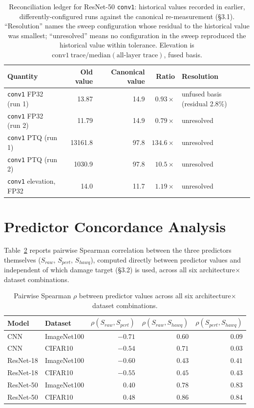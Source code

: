 \documentclass{article}
\begin{document}
\begin{table}[h]
\centering
\small
\caption{Reconciliation ledger for ResNet-50 \texttt{conv1}: historical values recorded in earlier, differently-configured runs against the canonical re-measurement (\S3.1). ``Resolution'' names the sweep configuration whose residual to the historical value was smallest; ``unresolved'' means no configuration in the sweep reproduced the historical value within tolerance. Elevation is $\mathrm{conv1\ trace} / \mathrm{median}(\text{all-layer trace})$, fused basis.}
\label{tab:reconciliation}
\begin{tabular}{lrrrl}
\toprule
Quantity & Old value & Canonical value & Ratio & Resolution \\
\midrule
\texttt{conv1} FP32 (run 1) & 13.87 & 14.9 & $0.93\times$ & unfused basis (residual 2.8\%) \\
\texttt{conv1} FP32 (run 2) & 11.79 & 14.9 & $0.79\times$ & unresolved \\
\texttt{conv1} PTQ (run 1) & 13161.8 & 97.8 & $134.6\times$ & unresolved \\
\texttt{conv1} PTQ (run 2) & 1030.9 & 97.8 & $10.5\times$ & unresolved \\
\texttt{conv1} elevation, FP32 & 14.0 & 11.7 & $1.19\times$ & unresolved \\
\bottomrule
\end{tabular}
\end{table}

\section{Predictor Concordance Analysis}
\label{app:concordance}
Table~\ref{tab:concordance} reports pairwise Spearman correlation between the three predictors themselves ($S_{raw}$, $S_{pert}$, $S_{hawq}$), computed directly between predictor values and independent of which damage target (\S3.2) is used, across all six architecture$\times$dataset combinations.

\begin{table}[h]
\centering
\small
\caption{Pairwise Spearman $\rho$ between predictor values across all six architecture$\times$dataset combinations.}
\label{tab:concordance}
\begin{tabular}{llrrr}
\toprule
Model & Dataset & $\rho(S_{raw},S_{pert})$ & $\rho(S_{raw},S_{hawq})$ & $\rho(S_{pert},S_{hawq})$ \\
\midrule
CNN & ImageNet100 & $-0.71$ & $0.60$ & $0.09$ \\
CNN & CIFAR10 & $-0.54$ & $0.71$ & $0.03$ \\
ResNet-18 & ImageNet100 & $-0.60$ & $0.43$ & $0.41$ \\
ResNet-18 & CIFAR10 & $-0.55$ & $0.45$ & $0.43$ \\
ResNet-50 & ImageNet100 & $0.40$ & $0.78$ & $\mathbf{0.83}$ \\
ResNet-50 & CIFAR10 & $0.48$ & $0.86$ & $\mathbf{0.84}$ \\
\bottomrule
\end{tabular}
\end{table}
\end{document}
